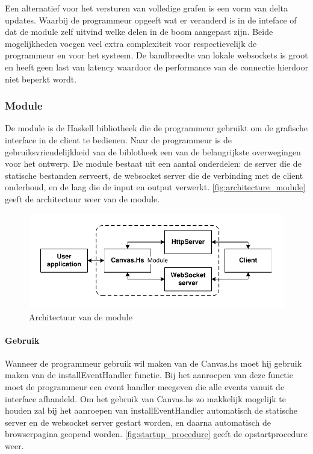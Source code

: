 Een alternatief voor het versturen van volledige grafen is een vorm van delta updates. Waarbij de programmeur opgeeft wat er veranderd is in de inteface of dat de module zelf uitvind welke delen in de boom aangepast zijn. Beide mogelijkheden voegen veel extra complexiteit voor respectievelijk de programmeur en voor het systeem. De bandbreedte van lokale websockets is groot en heeft geen last van latency waardoor de performance van de connectie hierdoor niet beperkt wordt.

\subsubsection{Module}
De module is de Haskell bibliotheek die de programmeur gebruikt om de grafische interface in de client te bedienen. Naar de programmeur is de gebruiksvriendelijkheid van de biblotheek een van de belangrijkste overwegingen voor het ontwerp. De module bestaat uit een aantal onderdelen: de server die de statische bestanden serveert, de websocket server die de verbinding met de client onderhoud, en de laag die de input en output verwerkt. \autoref{fig:architecture_module} geeft de architectuur weer van de module.

\begin{figure}
\begin{center}
\includegraphics[keepaspectratio,width=\textwidth]{./images/module_architecture.pdf}
\caption{Architectuur van de module}
\label{fig:architecture_module}
\end{center}
\end{figure}


\paragraph{Gebruik} Wanneer de programmeur gebruik wil maken van de Canvas.hs moet hij gebruik maken van de installEventHandler functie. Bij het aanroepen van deze functie moet de programmeur een event handler meegeven die alle events vanuit de interface afhandeld. Om het gebruik van Canvas.hs zo makkelijk mogelijk te houden zal bij het aanroepen van installEventHandler automatisch de statische server en de websocket server gestart worden, en daarna automatisch de browserpagina geopend worden. \autoref{fig:startup_procedure} geeft de opstartprocedure weer.

